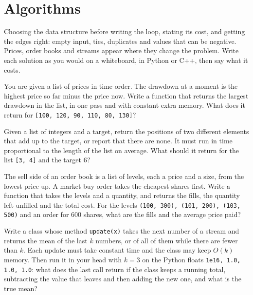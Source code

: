 \chapter{Algorithms}\label{ch:iv3:algorithms}

\begin{ivtrains}
Choosing the data structure before writing the loop, stating its cost, and getting the edges right: empty input, ties, duplicates and values that can be negative. Prices, order books and streams appear where they change the problem. Write each solution as you would on a whiteboard, in Python or C++, then say what it costs.
\end{ivtrains}

\begin{question}\label{iq:iv3:algorithms:1}
You are given a list of prices in time order. The drawdown at a moment is the highest price so far minus the price now. Write a function that returns the largest drawdown in the list, in one pass and with constant extra memory. What does it return for \texttt{[100, 120, 90, 110, 80, 130]}?
\end{question}

\begin{question}\label{iq:iv3:algorithms:2}
Given a list of integers and a target, return the positions of two different elements that add up to the target, or report that there are none. It must run in time proportional to the length of the list on average. What should it return for the list \texttt{[3, 4]} and the target 6?
\end{question}

\begin{question}\label{iq:iv3:algorithms:3}
The sell side of an order book is a list of levels, each a price and a size, from the lowest price up. A market buy order takes the cheapest shares first. Write a function that takes the levels and a quantity, and returns the fills, the quantity left unfilled and the total cost. For the levels \texttt{(100, 300), (101, 200), (103, 500)} and an order for 600 shares, what are the fills and the average price paid?
\end{question}

\begin{question}\label{iq:iv3:algorithms:4}
Write a class whose method \texttt{update(x)} takes the next number of a stream and returns the mean of the last $k$ numbers, or of all of them while there are fewer than $k$. Each update must take constant time and the class may keep $O(k)$ memory. Then run it in your head with $k = 3$ on the Python floats \texttt{1e16, 1.0, 1.0, 1.0}: what does the last call return if the class keeps a running total, subtracting the value that leaves and then adding the new one, and what is the true mean?
\end{question}

